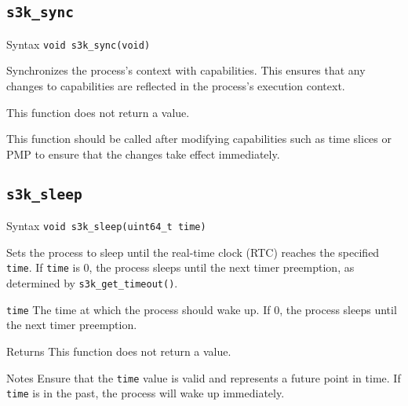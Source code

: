 \documentclass[a4paper,11pt]{article}
\newcommand{\syscall}[1]{\texttt{#1}}
\newenvironment{syscalldoc}[1]{
  \subsection{\syscall{#1}} %
  \begin{tcolorbox}
  \begin{description}[leftmargin=!,style=nextline,noitemsep]
}{
  \end{description}
  \end{tcolorbox}
}
\begin{document}
\begin{syscalldoc}{s3k\_sync}
  \item[Syntax] \lstinline{void s3k_sync(void)}
  \item[Description] Synchronizes the process's context with capabilities. This ensures that any changes to capabilities are reflected in the process's execution context.
  \item[Returns] This function does not return a value.
  \item[Notes] This function should be called after modifying capabilities such as time slices or PMP to ensure that the changes take effect immediately.
\end{syscalldoc}

\begin{syscalldoc}{s3k\_sleep}
  \item[Syntax] \lstinline{void s3k_sleep(uint64_t time)}
  \item[Description] Sets the process to sleep until the real-time clock (RTC) reaches the specified \verb|time|. If \verb|time| is 0, the process sleeps until the next timer preemption, as determined by \verb|s3k_get_timeout()|.
  \item[Parameters]
    \begin{description}
      \item[]
      \item[\texttt{time}] The time at which the process should wake up. If 0, the process sleeps until the next timer preemption.
    \end{description}
  \item[Returns] This function does not return a value.
  \item[Notes] Ensure that the \verb|time| value is valid and represents a future point in time. If \verb|time| is in the past, the process will wake up immediately.
\end{syscalldoc}
\end{document}
